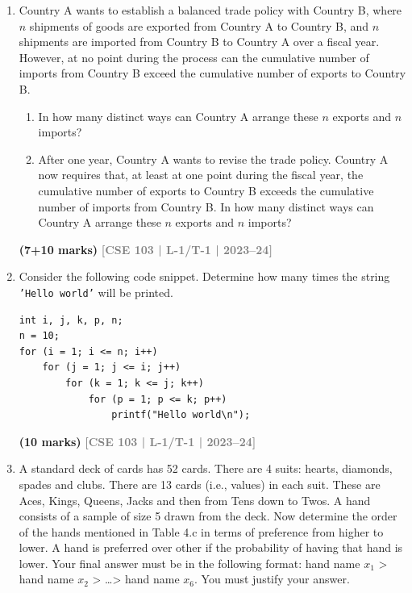 \documentclass[12pt,a3paper]{article}
\newcommand{\yr}[1]{\hfill\textcolor{gray}{\small\textbf{[#1]}}}
\newcommand{\mk}[1]{\textcolor{orange!70!black}{\small\textbf{(#1 marks)}}}
\begin{document}
\begin{enumerate}
\item Country A wants to establish a balanced trade policy with Country B, where $n$ shipments of goods are exported from Country A to Country B, and $n$ shipments are imported from Country B to Country A over a fiscal year. However, at no point during the process can the cumulative number of imports from Country B exceed the cumulative number of exports to Country B.
\begin{enumerate}
  \item In how many distinct ways can Country A arrange these $n$ exports and $n$ imports?
  \item After one year, Country A wants to revise the trade policy. Country A now requires that, at least at one point during the fiscal year, the cumulative number of exports to Country B exceeds the cumulative number of imports from Country B. In how many distinct ways can Country A arrange these $n$ exports and $n$ imports?
\end{enumerate}
\mk{7+10} \yr{CSE 103 | L-1/T-1 | 2023--24}

\item Consider the following code snippet. Determine how many times the string \texttt{'Hello world'} will be printed.
\begin{lstlisting}
int i, j, k, p, n;
n = 10;
for (i = 1; i <= n; i++)
    for (j = 1; j <= i; j++)
        for (k = 1; k <= j; k++)
            for (p = 1; p <= k; p++)
                printf("Hello world\n");
\end{lstlisting}
\mk{10} \yr{CSE 103 | L-1/T-1 | 2023--24}

\item A standard deck of cards has 52 cards. There are 4 suits: hearts, diamonds, spades and clubs. There are 13 cards (i.e., values) in each suit. These are Aces, Kings, Queens, Jacks and then from Tens down to Twos. A hand consists of a sample of size 5 drawn from the deck. Now determine the order of the hands mentioned in Table 4.c in terms of preference from higher to lower. A hand is preferred over other if the probability of having that hand is lower. Your final answer must be in the following format: hand name $x_1$ > hand name $x_2$ > \dots > hand name $x_{6}$. You must justify your answer.


\end{enumerate}
\end{document}
